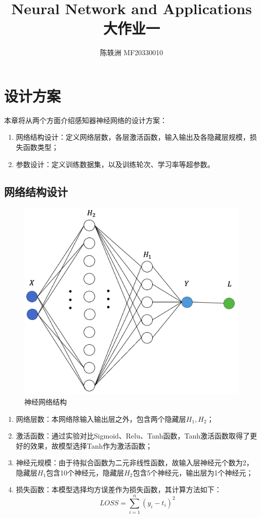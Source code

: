 \documentclass{article}
\title{Neural Network and Applications\\ 大作业一}
\author{陈轶洲 MF20330010}
\begin{document}
	\maketitle

\section{设计方案}
本章将从两个方面介绍感知器神经网络的设计方案：
\begin{enumerate}[1)]
	\item 网络结构设计：定义网络层数，各层激活函数，输入输出及各隐藏层规模，损失函数类型；
	\item 参数设计：定义训练数据集，以及训练轮次、学习率等超参数。
\end{enumerate}

\subsection{网络结构设计}
\begin{figure}[H]
	\centering
	\includegraphics[scale=0.6]{neural.png}
	\caption{神经网络结构}
\end{figure}
\begin{enumerate}[1)]
	\item 网络层数：本网络除输入输出层之外，包含两个隐藏层$ H_1,H_2 $；
	\item 激活函数：通过实验对比Sigmoid、Relu、Tanh函数，Tanh激活函数取得了更好的效果，故模型选择Tanh作为激活函数；
	\item 神经元规模：由于待拟合函数为二元非线性函数，故输入层神经元个数为2，隐藏层$ H_1 $包含10个神经元，隐藏层$ H_2 $包含5个神经元，输出层为1个神经元；
	\item 损失函数：本模型选择均方误差作为损失函数，其计算方法如下：
	\begin{equation}
		LOSS = \sum_{i=1}^{n}(y_i-t_i)^2
	\end{equation}
\end{enumerate}
\end{document}
